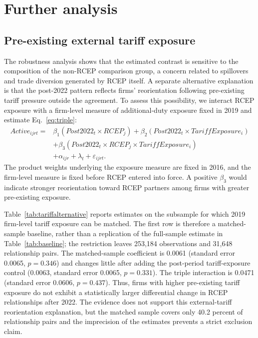 \documentclass[preprint,12pt,authoryear]{elsarticle}
\begin{document}
\section{Further analysis}
\label{sec:further}

\subsection{Pre-existing external tariff exposure}

The robustness analysis shows that the estimated contrast is sensitive to the composition of the non-RCEP comparison group, a concern related to spillovers and trade diversion generated by RCEP itself. A separate alternative explanation is that the post-2022 pattern reflects firms' reorientation following pre-existing tariff pressure outside the agreement. To assess this possibility, we interact RCEP exposure with a firm-level measure of additional-duty exposure fixed in 2019 and estimate Eq.~\eqref{eq:triple}:
\begin{equation}
\label{eq:triple}
\begin{aligned}
Active_{ijrt}={}&\beta_1(Post2022_t\times RCEP_j)+\beta_2(Post2022_t\times TariffExposure_i)\\
&+\beta_3(Post2022_t\times RCEP_j\times TariffExposure_i)\\
&+\alpha_{ijr}+\lambda_t+\varepsilon_{ijrt}.
\end{aligned}
\end{equation}
The product weights underlying the exposure measure are fixed in 2016, and the firm-level measure is fixed before RCEP entered into force. A positive $\beta_3$ would indicate stronger reorientation toward RCEP partners among firms with greater pre-existing exposure.

Table~\ref{tab:tariffalternative} reports estimates on the subsample for which 2019 firm-level tariff exposure can be matched. The first row is therefore a matched-sample baseline, rather than a replication of the full-sample estimate in Table~\ref{tab:baseline}; the restriction leaves 253,184 observations and 31,648 relationship pairs. The matched-sample coefficient is 0.0061 (standard error 0.0065, $p=0.346$) and changes little after adding the post-period tariff-exposure control (0.0063, standard error 0.0065, $p=0.331$). The triple interaction is 0.0471 (standard error 0.0606, $p=0.437$). Thus, firms with higher pre-existing tariff exposure do not exhibit a statistically larger differential change in RCEP relationships after 2022. The evidence does not support this external-tariff reorientation explanation, but the matched sample covers only 40.2 percent of relationship pairs and the imprecision of the estimates prevents a strict exclusion claim.
\end{document}
